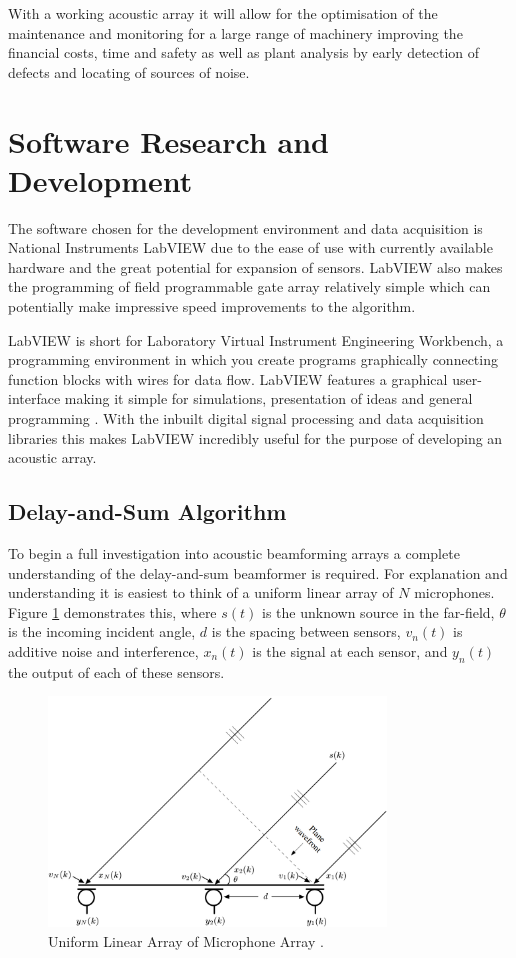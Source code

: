 \documentclass{UoNMCHA}
\numberwithin{equation}{section}
\begin{document}
    With a working acoustic array it will allow for the optimisation of the maintenance and monitoring for a large range of machinery improving the financial costs, time and safety as well as plant analysis by early detection of defects and locating of sources of noise.
\newpage
\section{Software Research and Development} \label{sec:Software}
    The software chosen for the development environment and data acquisition is National Instruments LabVIEW due to the ease of use with currently available hardware and the great potential for expansion of sensors. LabVIEW also makes the programming of field programmable gate array relatively simple which can potentially make impressive speed improvements to the algorithm.
    
    LabVIEW is short for Laboratory Virtual Instrument Engineering Workbench, a programming environment in which you create programs graphically connecting function blocks with wires for data flow. LabVIEW features a graphical user-interface making it simple for simulations, presentation of ideas and general programming \citep{Tra06}. With the inbuilt digital signal processing and data acquisition libraries this makes LabVIEW incredibly useful for the purpose of developing an acoustic array.
\subsection{Delay-and-Sum Algorithm} \label{sec:Software DAS}
    To begin a full investigation into acoustic beamforming arrays a complete understanding of the delay-and-sum beamformer is required. For explanation and understanding it is easiest to think of a uniform linear array of $N$ microphones. Figure \ref{fig:ULA} demonstrates this, where $s(t)$ is the unknown source in the far-field, $\theta$ is the incoming incident angle, $d$ is the spacing between sensors, $v_n(t)$ is additive noise and interference, $x_n(t)$ is the signal at each sensor, and $y_n(t)$ the output of each of these sensors.
    
    \begin{figure} [H]
        \centering
        \includegraphics[keepaspectratio, width = 0.8\textwidth]{Figures/ULA.png}
        \caption{Uniform Linear Array of Microphone Array \citep{Ben08}.}
        \label{fig:ULA}
    \end{figure}
    
\end{document}
